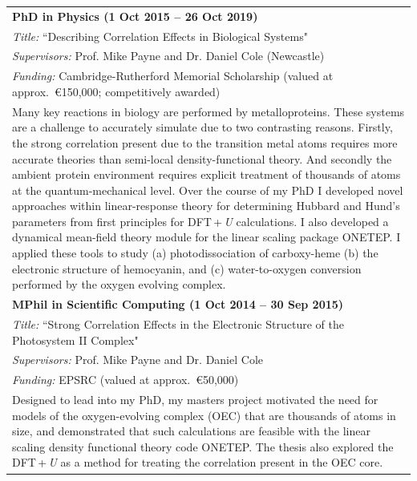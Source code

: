 \documentclass[10pt,a4paper,final]{article}
\begin{document}
\begin{tabularx}{\textwidth}{X}
   \textbf{PhD in Physics (1 Oct 2015 -- 26 Oct 2019)}                                                                                                                                                                                                                                                                                                                     \\
   \cellcolor{seaborn_bg_grey}%
   \noindent \textit{Title:} ``Describing Correlation Effects in Biological Systems"
   \\
   \cellcolor{seaborn_bg_grey}%
   \textit{Supervisors:} Prof. Mike Payne and Dr. Daniel Cole (Newcastle)
   \\
   \cellcolor{seaborn_bg_grey}%
   \textit{Funding:} Cambridge-Rutherford Memorial Scholarship (valued at approx.\ \euro{}150,000; competitively awarded)
   \\
   \cellcolor{seaborn_bg_grey}%
   Many key reactions in biology are performed by metalloproteins. These systems are a challenge to accurately simulate due to two contrasting reasons. Firstly, the strong correlation present due to the transition metal atoms requires more accurate theories than semi-local density-functional theory. And secondly the ambient protein environment requires explicit treatment of thousands of atoms at the quantum-mechanical level. Over the course of my PhD I developed novel approaches within linear-response theory for determining Hubbard and Hund's parameters from first principles for DFT\,+\,\emph{U} calculations. I also developed a dynamical mean-field theory module for the linear scaling package ONETEP. I applied these tools to study (a) photodissociation of carboxy-heme (b) the electronic structure of hemocyanin, and (c) water-to-oxygen conversion performed by the oxygen evolving complex.
   \\
   \rowcolor{seaborn_bg_grey}
   \textbf{MPhil in Scientific Computing (1 Oct 2014 -- 30 Sep 2015)}
   \\%
   \rowcolor{seaborn_bg_grey}

   \textit{Title:} ``Strong Correlation Effects in the Electronic Structure of the Photosystem II Complex"
   \\
   \rowcolor{seaborn_bg_grey}%

   \textit{Supervisors:} Prof. Mike Payne and Dr. Daniel Cole
   \\
   \rowcolor{seaborn_bg_grey}%

   \textit{Funding:} EPSRC (valued at approx.\ \euro{}50,000)
   \\
   \rowcolor{seaborn_bg_grey}

   Designed to lead into my PhD, my masters project motivated the need for models of the oxygen-evolving complex (OEC) that are thousands of atoms in size, and demonstrated that such calculations are feasible with the linear scaling density functional theory code ONETEP. The thesis also explored the DFT\,+\,\emph{U} as a method for treating the correlation present in the OEC core.
   \\
   \end{tabularx}
\end{document}
